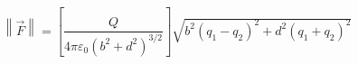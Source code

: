 \documentclass[preview]{standalone}
\begin{document}
\begin{align*}
\left\lVert \vec{F} \right\rVert = \left[ \dfrac{Q}{4 \pi \varepsilon_0 (b^2 + d^2)^{3/2}} \right] \sqrt{b^2(q_1 - q_2)^2 + d^2(q_1 + q_2)^2}
\end{align*}
\end{document}
